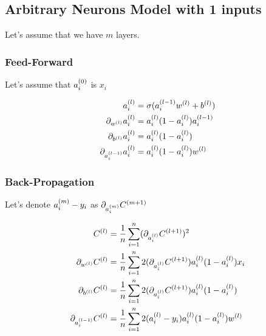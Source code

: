 \documentclass{article}
\begin{document}
\subsection{Arbitrary Neurons Model with 1 inputs}

Let's assume that we have $m$ layers.

\subsubsection{Feed-Forward}

Let's assume that $a_i\s[0]$ is $x_i$

\begin{align}
    a_i\s[l] &= \sigma(a_i\s[l-1]w\s[l] + b\s[l]) \\
    \pd[{w\s[l]}]a_i\s[l] &= a_i\s[l](1 - a_i\s[l])a_i\s[l-1] \\
    \pd[{b\s[l]}]a_i\s[l] &= a_i\s[l](1 - a_i\s[l]) \\
    \pd[{a_i\s[l-1]}]a_i\s[l] &= a_i\s[l](1 - a_i\s[l])w\s[l] \\
\end{align}

\subsubsection{Back-Propagation}

Let's denote $a_i\s[m] - y_i$ as $\pd[{a_i\s[m]}]C\s[m+1]$

\begin{align}
    C\s[l]
        &= \avgsum[i, n] (\pd[{a_i\s[l]}]C\s[l+1])^2 \\
    \pd[{w\s[l]}]C\s[l]
        &= \avgsum[i, n] 2(\pd[{a_i\s[l]}]C\s[l+1]) a_i\s[l](1 - a_i\s[l])x_i \\
    \pd[{b\s[l]}]C\s[l]
        &= \avgsum[i, n] 2(\pd[{a_i\s[l]}]C\s[l+1]) a_i\s[l](1 - a_i\s[l]) \\
    \pd[{a_i\s[l-1]}] C\s[l]
        &= \avgsum[i, n] 2(a_i\s[l] - y_i)a_i\s[l](1 - a_i\s[l])w\s[l]
\end{align}
\end{document}
